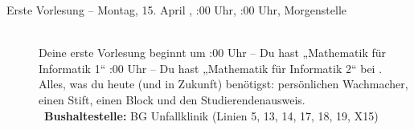 \begin{description}
\ifbachelor
	\item[Erste Vorlesung -- Montag, 15. April \YEAR, \ifwintersemester 8:00 Uhr, \else 10:00 Uhr, \fi Morgenstelle]~\\
	Deine erste Vorlesung beginnt um
	:00 Uhr -- Du hast „Mathematik für Informatik 1“  \fi
	:00 Uhr -- Du hast „Mathematik für Informatik 2“  \fi
	bei \Matheprof.
	Alles, was du heute (und in Zukunft) benötigst: persönlichen Wachmacher, einen Stift, einen Block und den Studierendenausweis.\\
	~\textbf{Bushaltestelle:} BG Unfallklinik (Linien 5, 13, 14, 17, 18, 19, X15)
\fi



\end{description}
